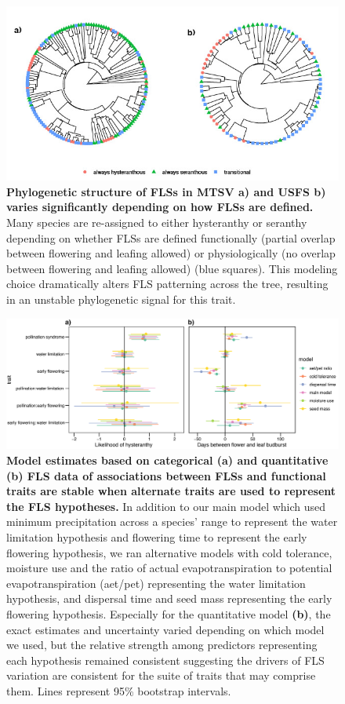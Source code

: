 \documentclass[11pt]{article}
\begin{document}
\begin{figure}[H]
\centering
\includegraphics[width=\textwidth]{..//..//cicletrees.jpg} 
\caption{\textbf{Phylogenetic structure of FLSs in MTSV \textbf{a)} and USFS \textbf{b)} varies significantly depending on how FLSs are defined.} Many species are re-assigned to either hysteranthy or seranthy depending on whether FLSs are defined functionally (partial overlap between flowering and leafing allowed) or physiologically (no overlap between flowering and leafing allowed) (blue squares). This modeling choice dramatically alters FLS patterning across the tree, resulting in an unstable phylogenetic signal for this trait.}
\label{fig:phylogeny}
\end{figure}

\begin{figure}[H]
\centering
\includegraphics[width=\textwidth]{..//..//alternatepredictors.png} 
\caption{\textbf{Model estimates based on categorical (a) and quantitative (b) FLS data of associations between FLSs and functional traits are stable when alternate traits are used to represent the FLS hypotheses.} In addition to our main model which used minimum precipitation across a species' range to represent the water limitation hypothesis and flowering time to represent the early flowering hypothesis, we ran alternative models with cold tolerance, moisture use and the ratio of actual evapotranspiration to potential evapotranspiration (aet/pet) representing the water limitation hypothesis, and dispersal time and seed mass representing the early flowering hypothesis. Especially for the quantitative model \textbf{(b)}, the exact estimates and uncertainty varied depending on which model we used, but the relative strength among predictors representing each hypothesis remained consistent suggesting the drivers of FLS variation are consistent for the suite of traits that may comprise them. Lines represent 95\% bootstrap intervals.} 
\label{fig:altpreds}
\end{figure}
\end{document}
